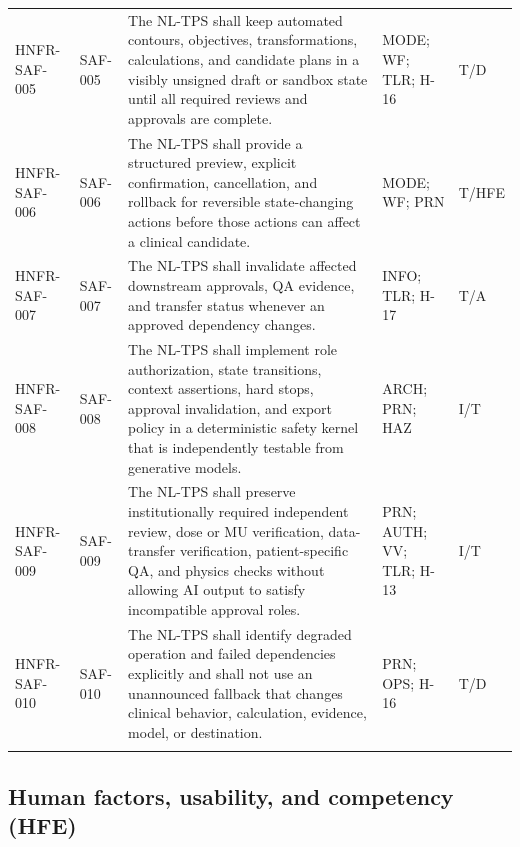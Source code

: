 \documentclass[11pt,letterpaper]{article}
\begin{document}
\begin{scriptsize}
\begin{longtable}{@{}L{0.14\textwidth}L{0.09\textwidth}L{0.47\textwidth}L{0.15\textwidth}L{0.07\textwidth}@{}}
\addlinespace[2pt]
\mbox{HNFR-SAF-005} & \mbox{SAF-005} & The NL-TPS shall keep automated contours, objectives, transformations, calculations, and candidate plans in a visibly unsigned draft or sandbox state until all required reviews and approvals are complete. & MODE; WF; TLR; H-16 & T\slash\allowbreak{}D \\
\addlinespace[2pt]
\mbox{HNFR-SAF-006} & \mbox{SAF-006} & The NL-TPS shall provide a structured preview, explicit confirmation, cancellation, and rollback for reversible state-changing actions before those actions can affect a clinical candidate. & MODE; WF; PRN & T\slash\allowbreak{}HFE \\
\addlinespace[2pt]
\mbox{HNFR-SAF-007} & \mbox{SAF-007} & The NL-TPS shall invalidate affected downstream approvals, QA evidence, and transfer status whenever an approved dependency changes. & INFO; TLR; H-17 & T\slash\allowbreak{}A \\
\addlinespace[2pt]
\mbox{HNFR-SAF-008} & \mbox{SAF-008} & The NL-TPS shall implement role authorization, state transitions, context assertions, hard stops, approval invalidation, and export policy in a deterministic safety kernel that is independently testable from generative models. & ARCH; PRN; HAZ & I\slash\allowbreak{}T \\
\addlinespace[2pt]
\mbox{HNFR-SAF-009} & \mbox{SAF-009} & The NL-TPS shall preserve institutionally required independent review, dose or MU verification, data-transfer verification, patient-specific QA, and physics checks without allowing AI output to satisfy incompatible approval roles. & PRN; AUTH; VV; TLR; H-13 & I\slash\allowbreak{}T \\
\addlinespace[2pt]
\mbox{HNFR-SAF-010} & \mbox{SAF-010} & The NL-TPS shall identify degraded operation and failed dependencies explicitly and shall not use an unannounced fallback that changes clinical behavior, calculation, evidence, model, or destination. & PRN; OPS; H-16 & T\slash\allowbreak{}D \\
\addlinespace[2pt]
\end{longtable}
\end{scriptsize}

\subsection{Human factors, usability, and competency (HFE)}
\end{document}
